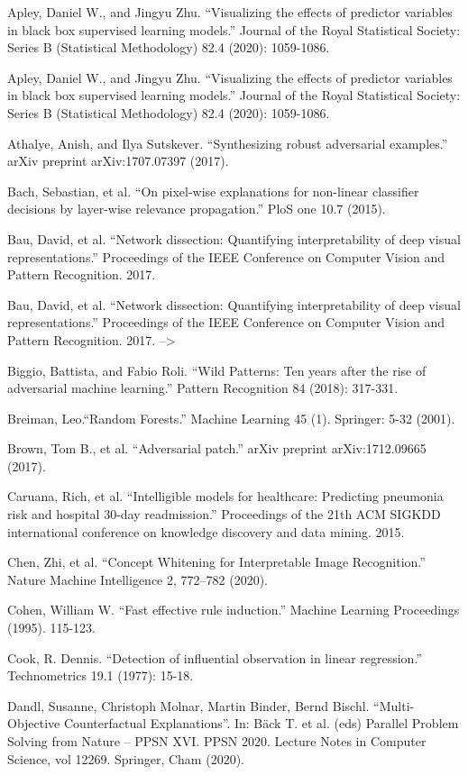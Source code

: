 \documentclass[12pt,]{krantz}
\begin{document}
Apley, Daniel W., and Jingyu Zhu. ``Visualizing the effects of predictor
variables in black box supervised learning models.'' Journal of the
Royal Statistical Society: Series B (Statistical Methodology) 82.4
(2020): 1059-1086.

Apley, Daniel W., and Jingyu Zhu. ``Visualizing the effects of predictor
variables in black box supervised learning models.'' Journal of the
Royal Statistical Society: Series B (Statistical Methodology) 82.4
(2020): 1059-1086.

Athalye, Anish, and Ilya Sutskever. ``Synthesizing robust adversarial
examples.'' arXiv preprint arXiv:1707.07397 (2017).

Bach, Sebastian, et al. ``On pixel-wise explanations for non-linear
classifier decisions by layer-wise relevance propagation.'' PloS one
10.7 (2015).

Bau, David, et al. ``Network dissection: Quantifying interpretability of
deep visual representations.'' Proceedings of the IEEE Conference on
Computer Vision and Pattern Recognition. 2017.

Bau, David, et al. ``Network dissection: Quantifying interpretability of
deep visual representations.'' Proceedings of the IEEE Conference on
Computer Vision and Pattern Recognition. 2017. --\textgreater{}

Biggio, Battista, and Fabio Roli. ``Wild Patterns: Ten years after the
rise of adversarial machine learning.'' Pattern Recognition 84 (2018):
317-331.

Breiman, Leo.``Random Forests.'' Machine Learning 45 (1). Springer: 5-32
(2001).

Brown, Tom B., et al. ``Adversarial patch.'' arXiv preprint
arXiv:1712.09665 (2017).

Caruana, Rich, et al. ``Intelligible models for healthcare: Predicting
pneumonia risk and hospital 30-day readmission.'' Proceedings of the
21th ACM SIGKDD international conference on knowledge discovery and data
mining. 2015.

Chen, Zhi, et al. ``Concept Whitening for Interpretable Image
Recognition.'' Nature Machine Intelligence 2, 772--782 (2020).

Cohen, William W. ``Fast effective rule induction.'' Machine Learning
Proceedings (1995). 115-123.

Cook, R. Dennis. ``Detection of influential observation in linear
regression.'' Technometrics 19.1 (1977): 15-18.

Dandl, Susanne, Christoph Molnar, Martin Binder, Bernd Bischl.
``Multi-Objective Counterfactual Explanations''. In: Bäck T. et al.
(eds) Parallel Problem Solving from Nature -- PPSN XVI. PPSN 2020.
Lecture Notes in Computer Science, vol 12269. Springer, Cham (2020).
\end{document}
